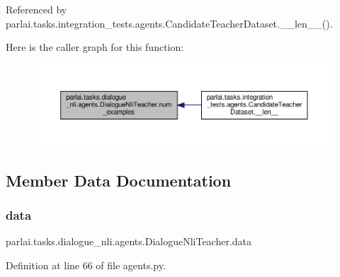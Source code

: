Referenced by parlai.\+tasks.\+integration\+\_\+tests.\+agents.\+Candidate\+Teacher\+Dataset.\+\_\+\+\_\+len\+\_\+\+\_\+().

Here is the caller graph for this function\+:
\nopagebreak
\begin{figure}[H]
\begin{center}
\leavevmode
\includegraphics[width=350pt]{classparlai_1_1tasks_1_1dialogue__nli_1_1agents_1_1DialogueNliTeacher_a54d9ea8b89d8b5b91c913612fba74726_icgraph}
\end{center}
\end{figure}


\subsection{Member Data Documentation}
\mbox{\label{classparlai_1_1tasks_1_1dialogue__nli_1_1agents_1_1DialogueNliTeacher_ae213e3aeb7ef16760a0c62ff1f77454e}} 
\subsubsection{\texorpdfstring{data}{data}}
{\footnotesize\ttfamily parlai.\+tasks.\+dialogue\+\_\+nli.\+agents.\+Dialogue\+Nli\+Teacher.\+data}



Definition at line 66 of file agents.\+py.



